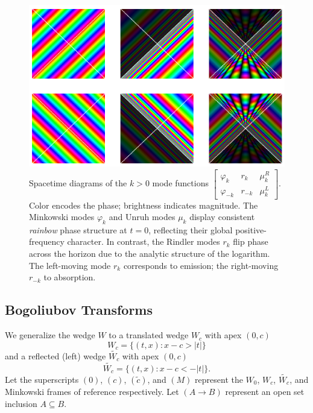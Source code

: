 \documentclass[12pt,a4paper]{article}
\begin{document}
\begin{figure}[h]
\centering
\includegraphics[scale=0.5]{unruh_mode_rainbow.png}
\captionsetup{width=0.7\textwidth}
\caption{Spacetime diagrams of the $k>0$ mode functions $\left[\begin{array}{ccc} \varphi_k & r_k & \mu^R_k \\ \varphi_{-k} & r_{-k} & \mu^L_k \end{array} \right]$. Color encodes the phase; brightness indicates magnitude. The Minkowski modes $\varphi_k$ and Unruh modes $\mu_k$ display consistent {\it rainbow} phase structure at $t=0$, reflecting their global positive-frequency character. In contrast, the Rindler modes $r_k$ flip phase across the horizon due to the analytic structure of the logarithm. The left-moving mode $r_k$ corresponds to emission; the right-moving $r_{-k}$ to absorption.}
\label{unruh_rainbow}
\end{figure}

\subsection{Bogoliubov Transforms}
We generalize the wedge $W$ to a translated wedge $W_c$ with apex $(0,c)$
\begin{equation}
 W_c = \{(t,x) : x - c > |t|\} 
\end{equation}
and a reflected (left) wedge $\widetilde{W_c}$ with apex $(0,c)$
\begin{equation}
 \widetilde{W_c} = \{(t,x) : x - c < -|t|\}.
\end{equation}
Let the superscripts $(0)$, $(c)$, $(\widetilde{c})$, and $(M)$ represent the $W_0$, $W_c$, $\widetilde{W_c}$, and Minkowski frames of reference respectively.  Let $(A \rightarrow B)$ represent an open set inclusion $A \subseteq B$.
\end{document}
